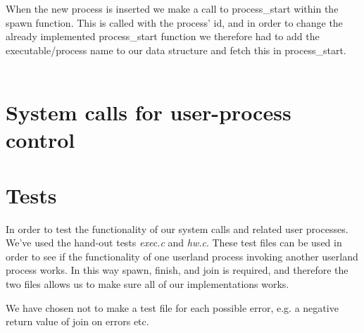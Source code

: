 \documentclass[12pt,a4paper,danish]{article}
\begin{document}
When the new process is inserted we make a call to process\_start within the spawn function. This is called with the process' id, and in order to change the already implemented process\_start function we therefore had to add the executable/process name to our data structure and fetch this in process\_start.\\\\

\section{System calls for user-process control}


\section{Tests}
In order to test the functionality of our system calls and related user processes. We've used the hand-out tests \textit{exec.c}  and \textit{hw.c}. These test files can be used in order to see if the functionality of one userland process invoking another userland process works. In this way spawn, finish, and join is required, and therefore the two files allows us to make sure all of our implementations works.

We have chosen not to make a test file for each possible error, e.g. a negative return value of join on errors etc.
\end{document}
